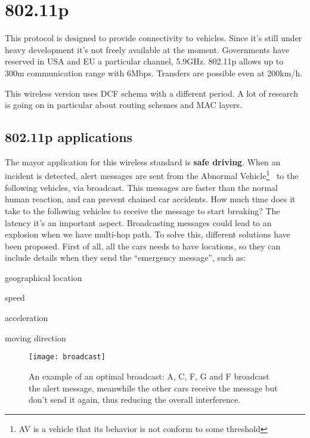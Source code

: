 \section{802.11p}

This protocol is designed to provide connectivity to vehicles. Since it's
still under heavy development it's not freely available at the moment.
Governments have reserved in USA and EU a particular channel, 5.9GHz. 802.11p
allows up to 300m communication range with 6Mbps. Transfers are possible
even at 200km/h.

This wireless version uses DCF schema with a different period. A lot of
research is going on in particular about routing schemes and MAC layers.

\subsection{802.11p applications}

The mayor application for this wireless standard is \textbf{safe driving}.
When an incident is detected, alert messages are sent from the Abnormal
Vehicle\footnote{AV is a vehicle that its behavior is not conform to some
threshold}~ to the following vehicles, via
broadcast. This messages are faster than the normal human reaction, and can
prevent chained car accidents. How much time does it take to the following
vehicles to receive the message to start breaking? The latency it's an important
aspect.
Broadcasting messages could lead to an explosion when we have multi-hop path.
To solve this, different solutions have been proposed.
First of all, all the cars needs to have locations, so they can include details
when they send the ``emergency message'', such as:
\begin{AutoMultiColItemize}
\item geographical location
\item speed
\item acceleration
\item moving direction
\end{AutoMultiColItemize}

\begin{figure}[t]
  \centering
  \texttt{[image: broadcast]}
  \caption[Optimal broadcast example]{
    An example of an optimal broadcast: A, C, F, G and F broadcast the alert
    message, meanwhile the other cars receive the message but don't send it
    again, thus reducing the overall interference.
  }
  \label{fig:802.11ws:broadcast}
\end{figure}

